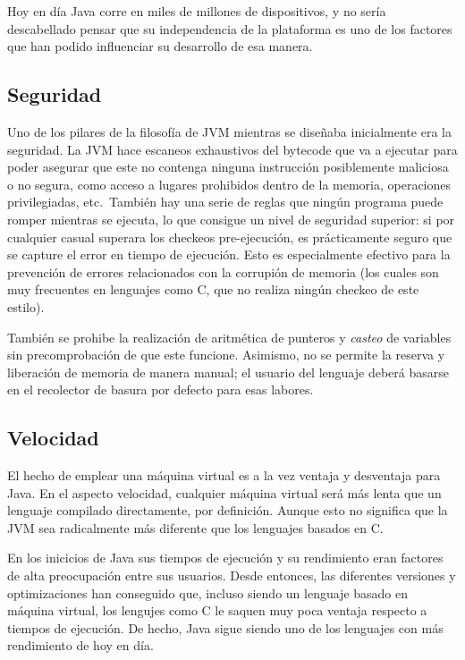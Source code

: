 \documentclass[english,runningheads,a4paper]{llncs}[2018/03/10]
\begin{document}
Hoy en día Java corre en miles de millones de dispositivos, y no sería
descabellado pensar que su independencia de la plataforma es uno de los
factores que han podido influenciar su desarrollo de esa manera. 

\subsection*{Seguridad}
Uno de los pilares de la filosofía de JVM mientras se diseñaba inicialmente era
la seguridad. La JVM hace escaneos exhaustivos del bytecode que va a ejecutar
para poder asegurar que este no contenga ninguna instrucción posiblemente
maliciosa o no segura, como acceso a lugares prohibidos dentro de la memoria,
operaciones privilegiadas, etc.\ También hay una serie de reglas que ningún
programa puede romper mientras se ejecuta, lo que consigue un nivel de seguridad
superior: si por cualquier casual superara los checkeos pre-ejecución, es
prácticamente seguro que se capture el error en tiempo de ejecución. Esto es
especialmente efectivo para la prevención de errores relacionados con la
corrupión de memoria (los cuales son muy frecuentes en lenguajes como C, que no
realiza ningún checkeo de este estilo).

También se prohibe la realización de aritmética de punteros y \textit{casteo} de
variables sin precomprobación de que este funcione. Asimismo, no se permite la
reserva y liberación de memoria de manera manual; el usuario del lenguaje deberá
basarse en el recolector de basura por defecto para esas labores.

\subsection*{Velocidad}
El hecho de emplear una máquina virtual es a la vez ventaja y desventaja para
Java. En el aspecto velocidad, cualquier máquina virtual será más lenta que un
lenguaje compilado directamente, por definición. Aunque esto no significa que la JVM
sea radicalmente más diferente que los lenguajes basados en C.

En los inicicios de Java sus tiempos de ejecución y su rendimiento eran factores
de alta preocupación entre sus usuarios. Desde entonces, las diferentes
versiones y optimizaciones han conseguido que, incluso siendo un lenguaje
basado en máquina virtual, los lengujes como C le saquen muy poca ventaja
respecto a tiempos de ejecución. De hecho, Java sigue siendo uno de los
lenguajes con más rendimiento de hoy en día.
\end{document}
